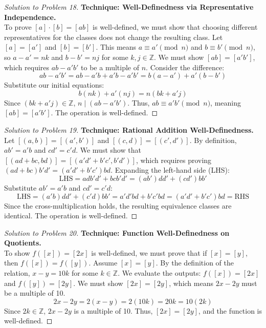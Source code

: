 \documentclass[11pt, a4paper]{article}
\theoremstyle{definition}
\theoremstyle{remark}
\newcommand{\Z}{\mathbb{Z}}
\begin{document}
\begin{proof}[Solution to Problem 18]
    \textbf{Technique: Well-Definedness via Representative Independence.} \\
    To prove $[a] \cdot [b] = [ab]$ is well-defined, we must show that choosing different representatives for the classes does not change the resulting class. Let $[a] = [a']$ and $[b] = [b']$. This means $a \equiv a' \pmod n$ and $b \equiv b' \pmod n$, so $a - a' = nk$ and $b - b' = nj$ for some $k, j \in \Z$.
    We must show $[ab] = [a'b']$, which requires $ab - a'b'$ to be a multiple of $n$.
    Consider the difference:
    \[ ab - a'b' = ab - a'b + a'b - a'b' = b(a - a') + a'(b - b') \]
    Substitute our initial equations:
    \[ b(nk) + a'(nj) = n(bk + a'j) \]
    Since $(bk + a'j) \in \Z$, $n \mid (ab - a'b')$. Thus, $ab \equiv a'b' \pmod n$, meaning $[ab] = [a'b']$. The operation is well-defined.
\end{proof}

\begin{proof}[Solution to Problem 19]
    \textbf{Technique: Rational Addition Well-Definedness.} \\
    Let $[(a,b)] = [(a',b')]$ and $[(c,d)] = [(c',d')]$. By definition, $ab' = a'b$ and $cd' = c'd$. We must show that $[(ad+bc, bd)] = [(a'd'+b'c', b'd')]$, which requires proving $(ad+bc)b'd' = (a'd'+b'c')bd$.
    Expanding the left-hand side (LHS):
    \[ \text{LHS} = adb'd' + bcb'd' = (ab')dd' + (cd')bb' \]
    Substitute $ab' = a'b$ and $cd' = c'd$:
    \[ \text{LHS} = (a'b)dd' + (c'd)bb' = a'd'bd + b'c'bd = (a'd' + b'c')bd = \text{RHS} \]
    Since the cross-multiplication holds, the resulting equivalence classes are identical. The operation is well-defined.
\end{proof}

\begin{proof}[Solution to Problem 20]
    \textbf{Technique: Function Well-Definedness on Quotients.} \\
    To show $f([x]) = [2x]$ is well-defined, we must prove that if $[x] = [y]$, then $f([x]) = f([y])$.
    Assume $[x] = [y]$. By the definition of the relation, $x - y = 10k$ for some $k \in \Z$.
    We evaluate the outputs: $f([x]) = [2x]$ and $f([y]) = [2y]$. We must show $[2x] = [2y]$, which means $2x - 2y$ must be a multiple of 10.
    \[ 2x - 2y = 2(x - y) = 2(10k) = 20k = 10(2k) \]
    Since $2k \in \Z$, $2x - 2y$ is a multiple of 10. Thus, $[2x] = [2y]$, and the function is well-defined.
\end{proof}
\end{document}
